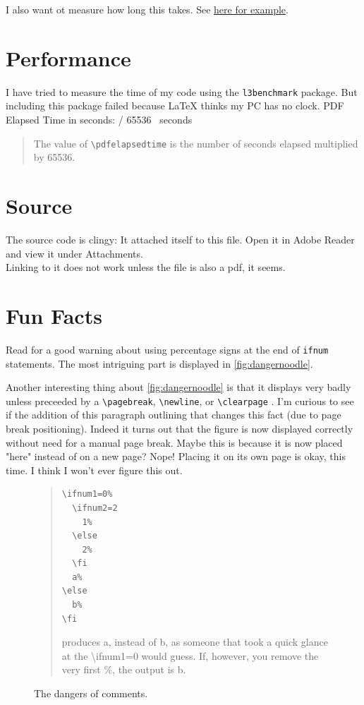 \documentclass{article} \usepackage[utf8]{inputenc}
\newcommand{\code}[1]{\colorbox{codebggray}{{\texttt{#1}}}}
\begin{document}
I also want ot measure how long this takes. See \href{https://tex.stackexchange.com/questions/505770/how-to-measure-the-compilation-time-of-a-document?rq=1}{here for example}.
\section{Performance}
I have tried to measure the time of my code using the \code{l3benchmark} package. But including this package failed because LaTeX thinks my PC has no clock.
PDF Elapsed Time in seconds: \the\numexpr \pdfelapsedtime / 65536 \relax ~seconds
\begin{myquote}\begin{quote}
The value of \code{\textbackslash pdfelapsedtime} is the number of seconds elapsed multiplied by 65536. 
\end{quote}\end{myquote}

\section{Source}
The source code is clingy: It attached itself to this file. Open it in Adobe Reader and view it under Attachments.\\
Linking to it does not work unless the file is also a pdf, it seems.

\section{Fun Facts}
Read  for a good warning about using percentage signs at the end of \code{ifnum} statements. The most intriguing part is displayed in \autoref{fig:dangernoodle}.

Another interesting thing about \autoref{fig:dangernoodle} is that it displays very badly unless preceeded by a \code{\textbackslash pagebreak}, \code{\textbackslash newline}, or \code{\textbackslash clearpage} . I'm curious to see if the addition of this paragraph outlining that changes this fact (due to page break positioning).
Indeed it turns out that the figure is now displayed correctly without need for a manual page break. Maybe this is because it is now placed "here" instead of on a new page? Nope! Placing it on its own page is okay, this time. I think I won't ever figure this out.

\begin{figure}[hbtp]
\begin{myquote}
\begin{quote}
\begin{lstlisting}[columns=fullflexible, backgroundcolor = \color{codebggray}]
\ifnum1=0%
  \ifnum2=2
    1%
  \else
    2%
  \fi
  a%
\else
  b%
\fi
\end{lstlisting}
produces a, instead of b, as someone that took a quick glance at the \textbackslash ifnum1=0 would guess. If, however, you remove the very first \%, the output is b.
\end{quote}
\end{myquote}
\caption{The dangers of comments.}
\label{fig:dangernoodle}
\end{figure}
\end{document}
